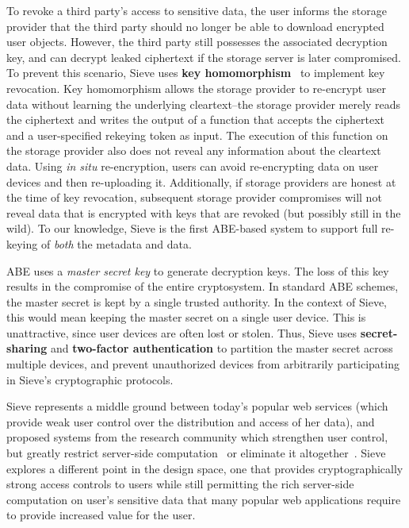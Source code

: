 \begin{smitemize}
  \item To revoke a third party's access to sensitive data,
  the user informs the storage provider that the third
  party should no longer be able to download encrypted
  user objects. However, the third party still possesses
  the associated decryption key, and can decrypt leaked
  ciphertext if the storage server is later compromised.
  To prevent this scenario, Sieve uses \textbf{key
  homomorphism}~\cite{keyhom} to implement key revocation. Key
  homomorphism allows the storage provider
  to re-encrypt user data without learning the underlying
  cleartext--the storage provider merely reads the
  ciphertext and writes the output of a function that
  accepts the ciphertext and a user-specified rekeying
  token as input. The execution of this function on the storage 
  provider also does not reveal any information about the 
  cleartext data. Using \textit{in situ} re-encryption,
  users can avoid re-encrypting data on user devices and
  then re-uploading it. Additionally, if storage providers
  are honest at the time of key revocation, subsequent
  storage provider compromises will not reveal data that
  is encrypted with keys that are revoked (but possibly
  still in the wild). To our knowledge, Sieve is the first 
  ABE-based system to support full re-keying of \textit{both}
  the metadata and data.

  \item ABE uses a \emph{master secret key} to generate
  decryption keys. The loss of this key results
  in the compromise of the entire cryptosystem. In
  standard ABE schemes, the master secret is kept by a
  single trusted authority. In the context of Sieve,
  this would mean keeping the master secret on a single
  user device. This is unattractive, since user devices
  are often lost or stolen. Thus, Sieve
  uses \textbf{secret-sharing} and \textbf{two-factor
  authentication} to partition the master secret across
  multiple devices, and prevent unauthorized devices
  from arbitrarily participating in Sieve's cryptographic
  protocols.
    
\end{smitemize}

Sieve represents a middle ground between today's
popular web services (which provide weak user
control over the distribution and access of her data), 
and proposed systems from the
research community which strengthen user control,
but greatly restrict server-side computation~\cite{mylar}
or eliminate it altogether~\cite{sundr,depot,sporc,bstore,depSky}.
Sieve explores a
different point in the design space, one that
provides cryptographically strong access controls
to users while still permitting the rich
server-side computation on user's sensitive data
that many popular web
applications require to provide increased value
for the user.

